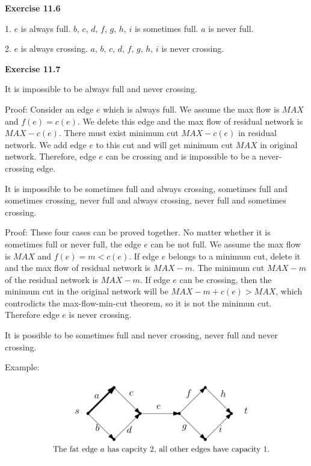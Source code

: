 \documentclass{article} %
\begin{document}
\textbf{Exercise 11.6}\par
	1. $e$ is always full. $b$, $c$, $d$, $f$, $g$, $h$, $i$ is sometimes full. $a$ is never full.\par
	2. $e$ is always crossing. $a$, $b$, $c$, $d$, $f$, $g$, $h$, $i$ is never crossing.\par
	
\textbf{Exercise 11.7}\par
	It is impossible to be always full and never crossing.\par
	Proof: Consider an edge $e$ which is always full. We assume the max flow is $MAX$ and $f(e)=c(e)$. We delete this edge and the max flow of residual network is $MAX-c(e)$.
	There must exist minimum cut $MAX-c(e)$ in residual network. We add edge $e$ to this cut and will get minimum cut $MAX$ in original network. Therefore, edge $e$ can be crossing and  is impossible to be a never-crossing edge.\par
	It is impossible to be sometimes full and always crossing, sometimes full and sometimes crossing, never full and always crossing, never full and sometimes crossing.\par
	Proof: These four cases can be proved together. No matter whether it is sometimes full or never full, the edge $e$ can be not full. We assume the max flow is $MAX$ and
	$f(e)=m<c(e)$. If edge $e$ belongs to a minimum cut, delete it and the max flow of residual network is $MAX-m$. The minimum cut $MAX-m$ of the residual network is $MAX-m$. If edge $e$ can be crossing, then the minimum cut in the original network will be $MAX-m+c(e)>MAX$, which controdicts the max-flow-min-cut theorem, so it is not the minimun cut. Therefore edge $e$ is never crossing. \par
	It is possible to be sometimes full and never crossing, never full and never crossing.\par
	Example:\par
    \begin{figure}[H]
  	\centering
  	\includegraphics[scale=0.5]{1.png}
  	\caption{}
  	\label{}
  	\end{figure}
	
\end{document}
